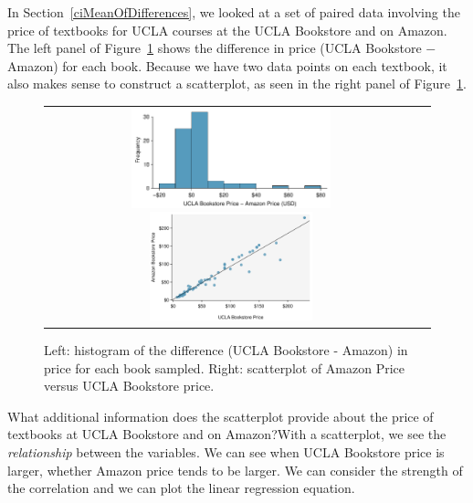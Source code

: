 In Section~\ref{ciMeanOfDifferences}, we looked at a set of paired data involving the price of textbooks for UCLA courses at the UCLA Bookstore and on Amazon.  The left panel of Figure~\ref{textbooksHistogramScatter} shows the difference in price (UCLA Bookstore $-$ Amazon) for each book.   Because we have two data points on each textbook, it also makes sense to construct a scatterplot, as seen in the right panel of Figure~\ref{textbooksHistogramScatter}.

\begin{figure}[h]
\centering
\begin{tabular}{cc}
\includegraphics[width=0.55\textwidth]{ch_inference_for_means/figures/textbooksF18/diffInTextbookPricesF18}
\includegraphics[width=0.45\textwidth]{ch_regr_simple_linear/figures/textbooks_scatter/textbooks_scatter}
\end{tabular}
\caption{Left: histogram of the difference (UCLA Bookstore - Amazon) in price for
    each book sampled.  Right: scatterplot of Amazon Price versus UCLA Bookstore price.}
\label{textbooksHistogramScatter}
\end{figure}


\begin{examplewrap}
\begin{nexample}
{What additional information does the scatterplot provide about the price of textbooks at UCLA Bookstore and on Amazon?}With a scatterplot, we see the \emph{relationship} between the variables.  We can see when UCLA Bookstore price is larger, whether Amazon price tends to be larger.  We can consider the strength of the correlation and we can plot the linear regression equation.  
\end{nexample}
\end{examplewrap}


